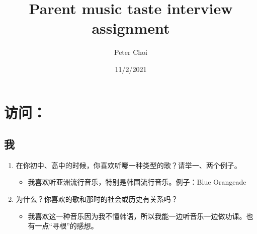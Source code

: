 \documentclass[11pt]{article}
\author{Peter Choi}
\date{11/2/2021}
\title{Parent music taste interview assignment}
\begin{document}
\maketitle
\tableofcontents


\section{访问：}
\label{sec:org10aeca8}
\subsection{我}
\label{sec:orgaac40b4}
\begin{enumerate}
\item 在你初中、高中的时候，你喜欢听哪一种类型的歌？请举一、两个例子。
\begin{itemize}
\item 我喜欢听亚洲流行音乐，特别是韩国流行音乐。例子：Blue Orangeade
\end{itemize}
\item 为什么？你喜欢的歌和那时的社会或历史有关系吗？
\begin{itemize}
\item 我喜欢这一种音乐因为我不懂韩语，所以我能一边听音乐一边做功课。也有一点“寻根”的感想。
\end{itemize}
\end{enumerate}
\end{document}
